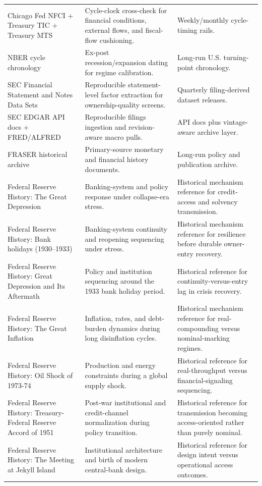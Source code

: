 \documentclass[11pt,openany]{book}
\begin{document}
\begin{longtable}{>{\raggedright\arraybackslash}p{}p{}p{}}
Chicago Fed NFCI + Treasury TIC + Treasury MTS & Cycle-clock cross-check for financial conditions, external flows, and fiscal-flow cushioning. & Weekly/monthly cycle-timing rails. \\
NBER cycle chronology & Ex-post recession/expansion dating for regime calibration. & Long-run U.S. turning-point chronology. \\
SEC Financial Statement and Notes Data Sets & Reproducible statement-level factor extraction for ownership-quality screens. & Quarterly filing-derived dataset releases. \\
SEC EDGAR API docs + FRED/ALFRED & Reproducible filings ingestion and revision-aware macro pulls. & API docs plus vintage-aware archive layer. \\
FRASER historical archive & Primary-source monetary and financial history documents. & Long-run policy and publication archive. \\
Federal Reserve History: The Great Depression & Banking-system and policy response under collapse-era stress. & Historical mechanism reference for credit-access and solvency transmission. \\
Federal Reserve History: Bank holidays (1930--1933) & Banking-system continuity and reopening sequencing under stress. & Historical mechanism reference for resilience before durable owner-entry recovery. \\
Federal Reserve History: Great Depression and Its Aftermath & Policy and institution sequencing around the 1933 bank holiday period. & Historical reference for continuity-versus-entry lag in crisis recovery. \\
Federal Reserve History: The Great Inflation & Inflation, rates, and debt-burden dynamics during long disinflation cycles. & Historical mechanism reference for real-compounding versus nominal-marking regimes. \\
Federal Reserve History: Oil Shock of 1973-74 & Production and energy constraints during a global supply shock. & Historical reference for real-throughput versus financial-signaling sequencing. \\
Federal Reserve History: Treasury-Federal Reserve Accord of 1951 & Post-war institutional and credit-channel normalization during policy transition. & Historical reference for transmission becoming access-oriented rather than purely nominal. \\
Federal Reserve History: The Meeting at Jekyll Island & Institutional architecture and birth of modern central-bank design. & Historical reference for design intent versus operational access outcomes. \\

\end{longtable}
\end{document}
